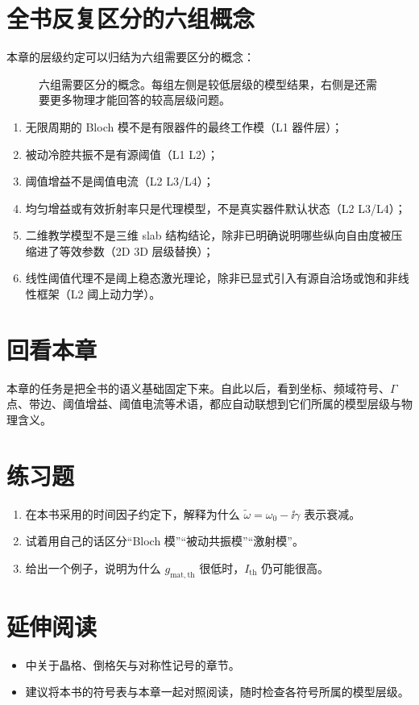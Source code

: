\section{全书反复区分的六组概念}
\label{sec:six-redlines}
本章的层级约定可以归结为六组需要区分的概念：
\begin{figure}[htbp]
  \centering
  
  \caption{六组需要区分的概念。每组左侧是较低层级的模型结果，右侧是还需要更多物理才能回答的较高层级问题。}
  \label{fig:ch02_six_redlines}
\end{figure}
\begin{enumerate}
  \item 无限周期的 Bloch 模不是有限器件的最终工作模（L1 \textrightarrow{} 器件层）；
  \item 被动冷腔共振不是有源阈值（L1 \textrightarrow{} L2）；
  \item 阈值增益不是阈值电流（L2 \textrightarrow{} L3/L4）；
  \item 均匀增益或有效折射率只是代理模型，不是真实器件默认状态（L2 \textrightarrow{} L3/L4）；
  \item 二维教学模型不是三维 slab 结构结论，除非已明确说明哪些纵向自由度被压缩进了等效参数（2D \textrightarrow{} 3D 层级替换）；
  \item 线性阈值代理不是阈上稳态激光理论，除非已显式引入有源自洽场或饱和非线性框架（L2 \textrightarrow{} 阈上动力学）。
\end{enumerate}

\section*{回看本章}
本章的任务是把全书的语义基础固定下来。自此以后，看到坐标、频域符号、$\Gamma$ 点、带边、阈值增益、阈值电流等术语，都应自动联想到它们所属的模型层级与物理含义。

\section*{练习题}
\begin{enumerate}
  \item \basicq 在本书采用的时间因子约定下，解释为什么 $\tilde{\omega}=\omega_0-\ii\gamma$ 表示衰减。

  \item \midq 试着用自己的话区分“Bloch 模”“被动共振模”“激射模”。

  \item \hardq 给出一个例子，说明为什么 $g_\mathrm{mat,th}$ 很低时，$I_\mathrm{th}$ 仍可能很高。
\end{enumerate}

\section*{延伸阅读}
\begin{itemize}
  \item \cite{sakoda2005} 中关于晶格、倒格矢与对称性记号的章节。

  \item 建议将本书的符号表与本章一起对照阅读，随时检查各符号所属的模型层级。
\end{itemize}

